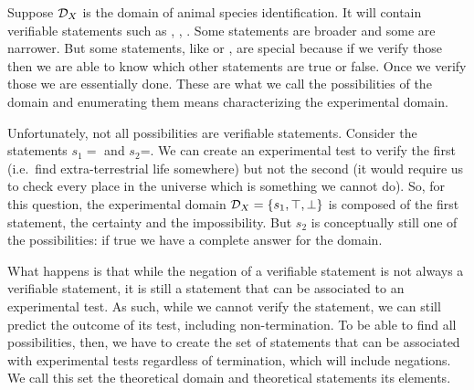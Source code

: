 \documentclass[11pt,letterpaper,fleqn]{memoir} %
\begin{document}
Suppose $\mathcal{D}_X$ is the domain of animal species identification. It will contain verifiable statements such as , , . Some statements are broader and some are narrower. But some statements, like  or , are special because if we verify those then we are able to know which other statements are true or false. Once we verify those we are essentially done. These are what we call the possibilities of the domain and enumerating them means characterizing the experimental domain.

Unfortunately, not all possibilities are verifiable statements. Consider the statements $s_1=$ and $s_2$=. We can create an experimental test to verify the first (i.e.~find extra-terrestrial life somewhere) but not the second (it would require us to check every place in the universe which is something we cannot do). So, for this question, the experimental domain $\mathcal{D}_X = \{s_1, \top, \bot\}$ is composed of the first statement, the certainty and the impossibility. But $s_2$ is conceptually still one of the possibilities: if true we have a complete answer for the domain.

What happens is that while the negation of a verifiable statement is not always a verifiable statement, it is still a statement that can be associated to an experimental test. As such, while we cannot verify the statement, we can still predict the outcome of its test, including non-termination. To be able to find all possibilities, then, we have to create the set of statements that can be associated with experimental tests regardless of termination, which will include negations. We call this set the theoretical domain and theoretical statements its elements.
\end{document}
